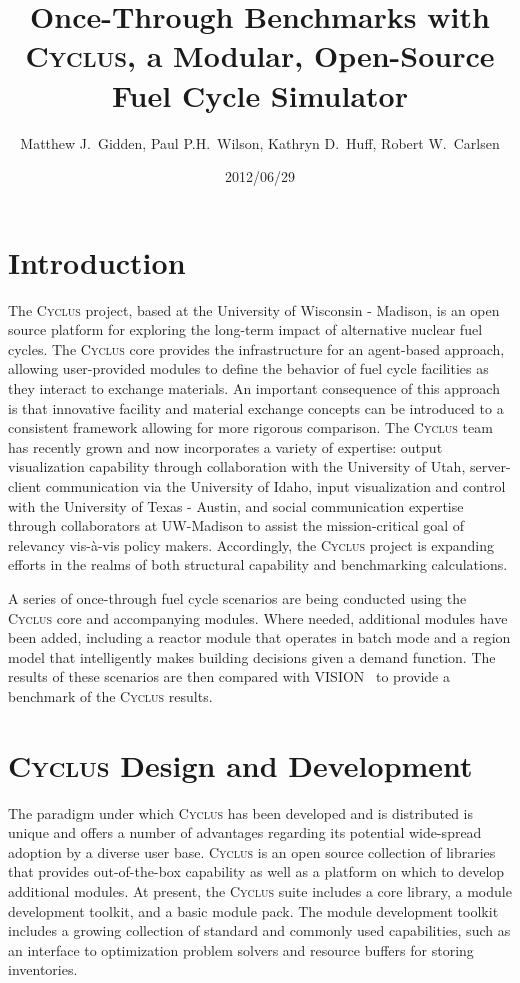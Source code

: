 \documentclass{anstrans}
\title{Once-Through Benchmarks with \textsc{Cyclus}, a Modular, Open-Source Fuel Cycle Simulator}
\author{Matthew J.~Gidden, Paul P.H.~Wilson, Kathryn D.~Huff, Robert W.~Carlsen}
\institute{Department of Nuclear Engineering \& Engineering Physics, University of Wisconsin - Madison, Madison, WI, 53703}
\date{2012/06/29}
\begin{document}
\section{Introduction}
The \textsc{Cyclus} project, based at the University of Wisconsin -
Madison, is an open source platform for exploring the long-term impact
of alternative nuclear fuel cycles.  The \textsc{Cyclus} core provides
the infrastructure for an agent-based approach, allowing user-provided
modules to define the behavior of fuel cycle facilities as they
interact to exchange materials.  An important consequence of this
approach is that innovative facility and material exchange concepts
can be introduced to a consistent framework allowing for more rigorous
comparison.  The \textsc{Cyclus} team has recently grown and now
incorporates a variety of expertise: output visualization capability
through collaboration with the University of Utah, server-client
communication via the University of Idaho, input visualization and
control with the University of Texas - Austin, and social
communication expertise through collaborators at UW-Madison to assist
the mission-critical goal of relevancy vis-\`{a}-vis policy
makers. Accordingly, the \textsc{Cyclus} project is expanding efforts in
the realms of both structural capability and benchmarking
calculations.

A series of once-through fuel cycle scenarios are being conducted
using the \textsc{Cyclus} core and accompanying modules. Where needed,
additional modules have been added, including a reactor module that operates 
in batch mode and a region model that intelligently makes building decisions 
given a demand function. The results of these scenarios are then compared with
VISION~\cite{vision2009} to provide a benchmark of the \textsc{Cyclus}
results.

\section{\textsc{Cyclus} Design and Development}
The paradigm under which \textsc{Cyclus} has been developed and is
distributed is unique and offers a number of advantages regarding its
potential wide-spread adoption by a diverse user base. \textsc{Cyclus}
is an open source collection of libraries that provides
out-of-the-box capability as well as a platform on which to develop
additional modules. At present, the \textsc{Cyclus} suite includes a
core library, a module development toolkit, and a basic module pack.
The module development toolkit includes a growing collection of
standard and commonly used capabilities, such as an interface to optimization 
problem solvers and resource buffers for storing inventories.
\end{document}
